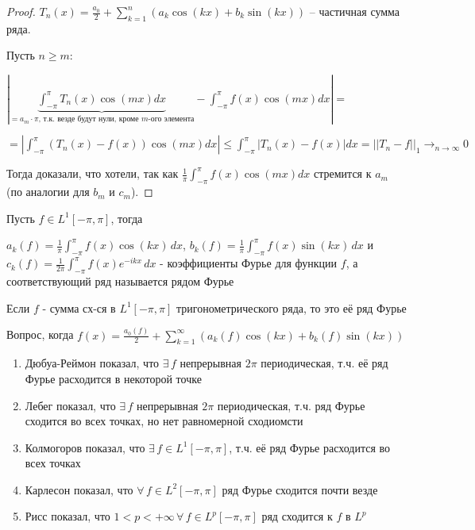 \begin{proof}

    $T_n (x) = \frac{a_0}{2} + \sum_{k = 1}^n (a_k \cos (kx) + b_k \sin (kx))$ -- частичная сумма ряда.

    Пусть $n \geq m$:

    $|\underbrace{\int_{-\pi}^{\pi} T_n(x) \cos{(m x)} dx}_{= a_m \cdot \pi \text{, т.к. везде будут нули, кроме $m$-ого элемента}} - \int_{-\pi}^{\pi} f(x) \cos{(m x)} dx| =$
    
    $= |\int_{-\pi}^{\pi} \left(T_n(x) - f(x)\right) \cos{(m x)} dx | \leq \int_{-\pi}^{\pi} |T_n(x) - f(x)| dx = || T_n - f ||_1 \to_{n \to \infty} 0$

    Тогда доказали, что хотели, так как $\frac{1}{\pi} \int_{-\pi}^{\pi} f(x) \cos{(mx)} dx$ стремится к $a_m$ (по аналогии для $b_m$ и $c_m$).


\end{proof}

\begin{definition}
    Пусть $f \in L^1 [-\pi, \pi]$, тогда
    
    $a_k (f) = \frac{1}{\pi} \int_{-\pi}^\pi f(x) \cos (kx) \, dx$, $b_k (f) = \frac{1}{\pi} \int_{-\pi}^\pi f(x) \sin (kx) \, dx$ и 
    $c_k(f) = \frac{1}{2\pi} \int_{-\pi}^\pi f(x) e^{-ikx} \, dx$ - коэффициенты Фурье для функции $f$, а соответствующий ряд называется рядом Фурье
\end{definition}

\begin{remark}
    Если $f$ - сумма сх-ся в $L^1 [-\pi, \pi]$ тригонометрического ряда, то это её ряд Фурье

    Вопрос, когда $f (x) = \frac{a_0 (f)}{2} + \sum_{k = 1}^\infty (a_k (f) \cos (kx) + b_k (f) \sin (kx))$

    \begin{enumerate}
        \item {
            Дюбуа-Реймон показал, что $\exists \, f$ непрерывная $2\pi$ периодическая, т.ч. её ряд Фурье расходится в некоторой точке
        }
        \item {
            Лебег показал, что $\exists \, f$ непрерывная $2\pi$ периодическая, т.ч. ряд Фурье сходится во всех точках, но нет равномерной сходиомсти
        }
        \item {
            Колмогоров показал, что $\exists \, f \in L^1 [-\pi, \pi]$, т.ч. её ряд Фурье расходится во всех точках
        }
        \item {
            Карлесон показал, что $\forall \, f \in L^2 [-\pi, \pi]$ ряд Фурье сходится почти везде
        }
        \item {
            Рисс показал, что $1 < p < +\infty \, \forall \, f \in L^p [-\pi, \pi]$ ряд сходится к $f$ в $L^p$
        }
    \end{enumerate}
\end{remark}

